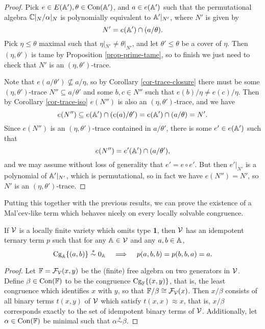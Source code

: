 \begin{appendices}
\begin{proof}
Pick $e \in E(\mathbb{A}'), \theta \in \operatorname{Con}(\mathbb{A}')$, and $a \in e(\mathbb{A}')$ such that the permutational algebra $\mathbb{C}|_N/\alpha|_N$ is polynomially equivalent to $\mathbb{A}'|_{N'}$, where $N'$ is given by
\[
N' = e(\mathbb{A}') \cap (a / \theta).
\]
Pick $\eta \le \theta$ maximal such that $\eta|_{N'} \ne \theta|_{N'}$, and let $\theta' \le \theta$ be a cover of $\eta$. Then $(\eta, \theta')$ is tame by Proposition \ref{prop-prime-tame}, so to finish we just need to check that $N'$ is an $(\eta,\theta')$-trace.

Note that $e(a/\theta') \not\subseteq a/\eta$, so by Corollary \ref{cor-trace-closure} there must be some $(\eta,\theta')$-trace $N'' \subseteq a/\theta'$ and some $b,c \in N''$ such that $e(b)/\eta \ne e(c)/\eta$. Then by Corollary \ref{cor-trace-iso} $e(N'')$ is also an $(\eta,\theta')$-trace, and we have
\[
e(N'') \subseteq e(\mathbb{A}') \cap (e(a)/\theta') = e(\mathbb{A}') \cap (a/\theta) = N'.
\]
Since $e(N'')$ is an $(\eta,\theta')$-trace contained in $a/\theta'$, there is some $e' \in e(\mathbb{A}')$ such that
\[
e(N'') = e'(\mathbb{A}') \cap (a/\theta'),
\]
and we may assume without loss of generality that $e' = e \circ e'$. But then $e'|_{N'}$ is a polynomial of $\mathbb{A}'|_{N'}$, which is permutational, so in fact we have $e(N'') = N'$, so $N'$ is an $(\eta,\theta')$-trace.
\end{proof}

Putting this together with the previous results, we can prove the existence of a Mal'cev-like term which behaves nicely on every locally solvable congruence.

\begin{thm}\label{thm-loc-solvable-malcev} If $\mathcal{V}$ is a locally finite variety which omits type \textbf{1}, then $\mathcal{V}$ has an idempotent ternary term $p$ such that for any $\mathbb{A} \in \mathcal{V}$ and any $a,b \in \mathbb{A}$,
\[
\operatorname{Cg}_{\mathbb{A}}\{(a,b)\} \stackrel{s}{\sim} 0_{\mathbb{A}} \;\;\; \implies \;\;\; p(a,b,b) = p(b,b,a) = a.
\]
\end{thm}
\begin{proof} Let $\mathbb{F} = \mathcal{F}_{\mathcal{V}}(x,y)$ be the (finite) free algebra on two generators in $\mathcal{V}$. Define $\beta \in \operatorname{Con}(\mathbb{F})$ to be the congruence $\operatorname{Cg}_{\mathbb{F}}\{(x,y)\}$, that is, the least congruence which identifies $x$ with $y$, so that $\mathbb{F}/\beta \cong \mathcal{F}_{\mathcal{V}}(x)$. Then $x/\beta$ consists of all binary terms $t(x,y)$ of $\mathcal{V}$ which satisfy $t(x,x) \approx x$, that is, $x/\beta$ corresponds exactly to the set of idempotent binary terms of $\mathcal{V}$. Additionally, let $\alpha \in \operatorname{Con}(\mathbb{F})$ be minimal such that $\alpha \stackrel{s}{\sim} \beta$.


\end{proof}
\end{appendices}
